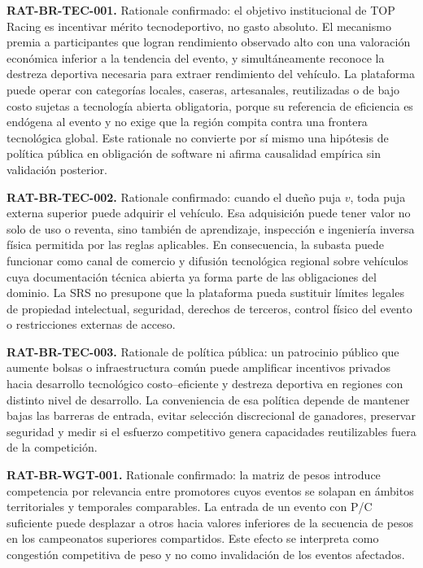\documentclass[10pt,letterpaper]{article}
\begin{document}
\noindent\textbf{RAT-BR-TEC-001.} Rationale confirmado: el objetivo institucional de TOP Racing es incentivar mérito tecnodeportivo, no gasto absoluto. El mecanismo premia a participantes que logran rendimiento observado alto con una valoración económica inferior a la tendencia del evento, y simultáneamente reconoce la destreza deportiva necesaria para extraer rendimiento del vehículo. La plataforma puede operar con categorías locales, caseras, artesanales, reutilizadas o de bajo costo sujetas a tecnología abierta obligatoria, porque su referencia de eficiencia es endógena al evento y no exige que la región compita contra una frontera tecnológica global. Este rationale no convierte por sí mismo una hipótesis de política pública en obligación de software ni afirma causalidad empírica sin validación posterior.\par
\noindent\textbf{RAT-BR-TEC-002.} Rationale confirmado: cuando el dueño puja $v$, toda puja externa superior puede adquirir el vehículo. Esa adquisición puede tener valor no solo de uso o reventa, sino también de aprendizaje, inspección e ingeniería inversa física permitida por las reglas aplicables. En consecuencia, la subasta puede funcionar como canal de comercio y difusión tecnológica regional sobre vehículos cuya documentación técnica abierta ya forma parte de las obligaciones del dominio. La SRS no presupone que la plataforma pueda sustituir límites legales de propiedad intelectual, seguridad, derechos de terceros, control físico del evento o restricciones externas de acceso.\par
\noindent\textbf{RAT-BR-TEC-003.} Rationale de política pública: un patrocinio público que aumente bolsas o infraestructura común puede amplificar incentivos privados hacia desarrollo tecnológico costo--eficiente y destreza deportiva en regiones con distinto nivel de desarrollo. La conveniencia de esa política depende de mantener bajas las barreras de entrada, evitar selección discrecional de ganadores, preservar seguridad y medir si el esfuerzo competitivo genera capacidades reutilizables fuera de la competición.\par
\noindent\textbf{RAT-BR-WGT-001.} Rationale confirmado: la matriz de pesos introduce competencia por relevancia entre promotores cuyos eventos se solapan en ámbitos territoriales y temporales comparables. La entrada de un evento con P/C suficiente puede desplazar a otros hacia valores inferiores de la secuencia de pesos en los campeonatos superiores compartidos. Este efecto se interpreta como congestión competitiva de peso y no como invalidación de los eventos afectados.\par
\end{document}
